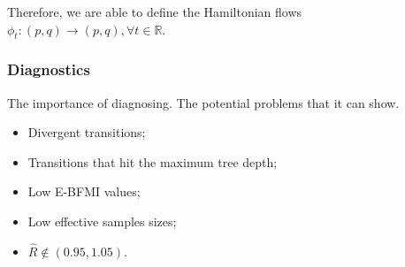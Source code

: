 Therefore, we are able to define the Hamiltonian flows $\phi_t : (p,q) \to
(p,q), \forall t \in \mathbb{R}$.

\subsubsection{Diagnostics}

The importance of diagnosing. The potential problems that it can show. 

\begin{itemize}
  \item Divergent transitions; 
  \item Transitions that hit the maximum tree depth; 
  \item Low E-BFMI values; 
  \item Low effective samples sizes; 
  \item $\hat{R} \not \in (0.95, 1.05)$.   
\end{itemize}